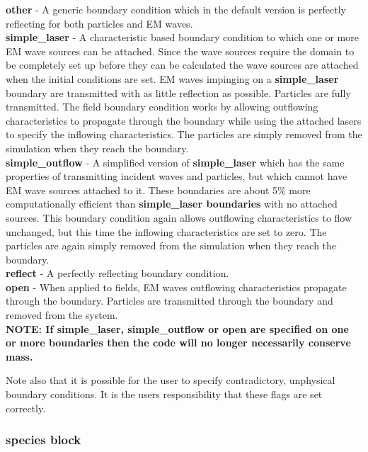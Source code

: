 \documentclass[12pt,a4paper]{article}
\newcommand{\emphtext}{\color{warwickdark} \fontfamily{phv}\selectfont\large\bf}
\newcommand{\inlineemph}[1]{{\color{warwicklight} \bf{#1}}}
\newcommand{\EPOCH}{{\color{warwickdark}\fontfamily{phv}\selectfont{EPOCH}}}
\begin{document}
{\emphtext other} - A generic boundary condition which in the default {\EPOCH}
version is perfectly reflecting for both particles and EM waves.\\

{\emphtext simple\_laser} - A characteristic based boundary condition to which
one or more EM wave sources can be attached. Since the wave sources require the
domain to be completely set up before they can be calculated the wave sources
are attached when the initial conditions are set.  EM waves impinging on a
\inlineemph{simple\_laser} boundary are transmitted with as little reflection
as possible. Particles are fully transmitted. The field boundary condition
works by allowing outflowing characteristics to propagate through the boundary
while using the attached lasers to specify the inflowing characteristics. The
particles are simply removed from the simulation when they reach the
boundary.\\

{\emphtext simple\_outflow} - A simplified version of \inlineemph{simple\_laser}
which has the same properties of transmitting incident waves and
particles, but which cannot have EM wave sources attached to it. These
boundaries are about 5\% more computationally efficient than
\inlineemph{simple\_laser boundaries} with no attached sources. This boundary
condition again allows outflowing characteristics to flow unchanged, but this
time the inflowing characteristics are set to zero. The particles are again
simply removed from the simulation when they reach the boundary.\\

{\emphtext reflect} - A perfectly reflecting boundary condition.\\

{\emphtext open} - When applied to fields, EM waves outflowing characteristics
propagate through the boundary. Particles are transmitted through the boundary
and removed from the system.\\

{\emphtext NOTE: If simple\_laser, simple\_outflow or open are specified on
one or more boundaries then the code will no longer necessarily conserve mass.}

Note also that it is possible for the user to specify contradictory,
unphysical boundary conditions. It is the users responsibility that these
flags are set correctly.

\subsubsection{\inlineemph{species} block}
\end{document}
